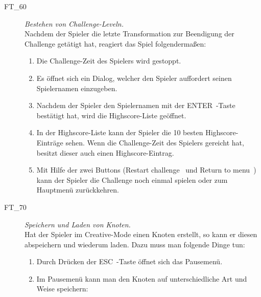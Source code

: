 \begin{description}
\begin{enumerate}
	\end{enumerate}
	

	
\label{FT:60}
	
	\item[FT\_60] \textit{Bestehen von Challenge-Leveln.} \hfill\\
	
	Nachdem der Spieler die letzte Transformation zur Beendigung der Challenge getätigt hat, reagiert das Spiel folgendermaßen:
	
	\begin{enumerate} 
	
	    \item Die Challenge-Zeit des Spielers wird gestoppt.
	    
		\item Es öffnet sich ein Dialog, welcher den Spieler auffordert seinen Spielernamen einzugeben.
		
		\item Nachdem der Spieler den Spielernamen mit der \glqq ENTER\grqq~-Taste bestätigt hat, wird die Highscore-Liste geöffnet.
		
		\item In der Highscore-Liste kann der Spieler die 10 besten Highscore-Einträge sehen. Wenn die Challenge-Zeit des Spielers gereicht hat, besitzt dieser auch einen Highscore-Eintrag.
		
		\item Mit Hilfe der zwei Buttons (\glqq Restart challenge\grqq~ und \glqq Return to menu\grqq~) kann der Spieler die Challenge noch einmal spielen oder zum Hauptmenü zurückkehren.
		~\\
			
	\end{enumerate}
	
	
\clearpage



\label{FT:70}

	\item[FT\_70] \textit{Speichern und Laden von Knoten.} \hfill\\
	
	Hat der Spieler im Creative-Mode einen Knoten erstellt, so kann er diesen abspeichern und wiederum laden. Dazu muss man folgende Dinge tun:
	
		\begin{enumerate} 
	
		\item  Durch Drücken der \glqq ESC\grqq~-Taste öffnet sich das Pausemenü.
		\item Im Pausemenü kann man den Knoten auf unterschiedliche Art und Weise speichern:
		 

\end{enumerate}
\end{description}
